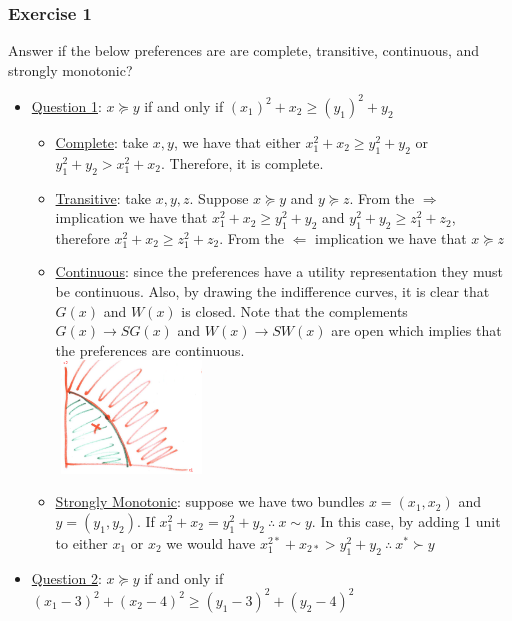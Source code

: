 \documentclass{article}
\begin{document}
\subsubsection{Exercise 1}
Answer if the below preferences are are complete, transitive, continuous, and strongly monotonic? \par \vspace{0.3em}
  \begin{itemize}
    \item  \underline{Question 1}: $x \succeq y$ if and only if $(x_{1})^{2} + x_{2} \geq (y_{1})^{2} + y_{2}$
    \begin{itemize}
      \item  \underline{Complete}: take $x,y$, we have that either $x_{1}^{2} + x_{2} \geq y_{1}^{2} + y_{2}$ or $y_{1}^{2} + y_{2} > x_{1}^{2} + x_{2}$. Therefore, it is complete.
      \item  \underline{Transitive}: take $x,y,z$. Suppose $x \succeq y$ and $y \succeq z$. From the $\Rightarrow$ implication we have that $x_{1}^{2} + x_{2} \geq y_{1}^{2} + y_{2}$ and $y_{1}^{2} + y_{2} \geq z_{1}^{2} + z_{2}$, therefore $x_{1}^{2} + x_{2} \geq z_{1}^{2} + z_{2}$. From the $\Leftarrow$ implication we have that $x \succeq z$
      \item  \underline{Continuous}: since the preferences have a utility representation they must be continuous. Also, by drawing the indifference curves, it is clear that $G(x)$ and $W(x)$ is closed. Note that the complements $G(x) \rightarrow SG(x)$ and $W(x) \rightarrow SW(x)$ are open which implies that the preferences are continuous. \\
      \includegraphics[width=4cm, height=3cm]{pic20}
      \item  \underline{Strongly Monotonic}: suppose we have two bundles $x = (x_{1}, x_{2})$ and $y = (y_{1}, y_{2})$. If $x_{1}^{2} + x_{2} = y_{1}^{2} + y_{2} \ \therefore \ x \sim y$. In this case, by adding 1 unit to either $x_{1}$ or $x_{2}$ we would have $x_{1}^{2*} + x_{2*} > y_{1}^{2} + y_{2} \ \therefore \ x^{*} \succ y$
    \end{itemize}
    \item  \underline{Question 2}: $x \succeq y$ if and only if $(x_{1} - 3)^{2} + (x_{2} - 4)^{2} \geq (y_{1} - 3)^{2} + (y_{2}-4)^{2}$

\end{itemize}
\end{document}
